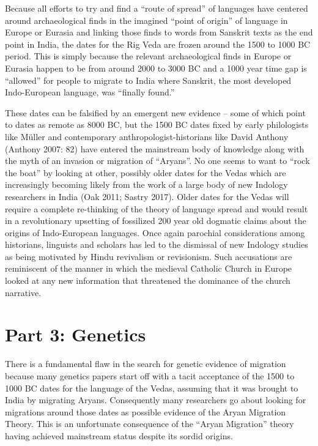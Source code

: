 \newpage

Because all efforts to try and find a “route of spread” of languages have centered around archaeological finds in the imagined “point of origin” of language in Europe or Eurasia and linking those finds to words from Sanskrit texts as the end point in India, the dates for the Rig Veda are frozen around the 1500 to 1000 BC period. This is simply because the relevant archaeological finds in Europe or Eurasia happen to be from around 2000 to 3000 BC and a 1000 year time gap is “allowed” for people to migrate to India where Sanskrit, the most developed Indo-European language, was “finally found.”

These dates can be falsified by an emergent new evidence – some of which point to dates as remote as 8000 BC, but the 1500 BC dates fixed by early philologists like Müller and contemporary anthropologist-historians like David Anthony (Anthony 2007: 82) have entered the mainstream body of knowledge along with the myth of an invasion or migration of “Aryans”. No one seems to want to “rock the boat” by looking at other, possibly older dates for the Vedas which are increasingly becoming likely from the work of a large body of new Indology researchers in India (Oak 2011; Sastry 2017). Older dates for the Vedas will require a complete re-thinking of the theory of language spread and would result in a revolutionary upsetting of fossilized 200 year old dogmatic claims about the origins of Indo-European languages. Once again parochial considerations among historians, linguists and scholars has led to the dismissal of new Indology studies as being motivated by Hindu revivalism or revisionism. Such accusations are reminiscent of the manner in which the medieval Catholic Church in Europe looked at any new information that threatened the dominance of the church narrative.


\section*{Part 3: Genetics}

There is a fundamental flaw in the search for genetic evidence of migration because many genetics papers start off with a tacit acceptance of the 1500 to 1000 BC dates for the language of the Vedas, assuming that it was brought to India by migrating Aryans. Consequently many researchers go about looking for migrations around those dates as possible evidence of the Aryan Migration Theory. This is an unfortunate consequence of the “Aryan Migration” theory having achieved mainstream status despite its sordid origins.

